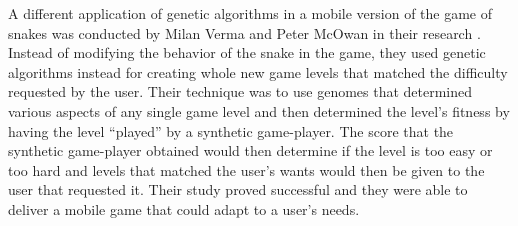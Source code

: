 A different application of genetic algorithms in a mobile version of the game of snakes was conducted by Milan Verma and Peter McOwan in their research \cite{Verma05}. Instead of modifying the behavior of the 
snake in the game, they used genetic algorithms instead for creating whole new game levels that matched the difficulty requested by the user. Their technique was to use genomes that determined various 
aspects of any single game level and then determined the level's fitness by having the level “played” by a synthetic game-player. The score that the synthetic game-player obtained would then determine 
if the level is too easy or too hard and levels that matched the user's wants would then be given to the user that requested it. Their study proved successful and they were able to deliver a 
mobile game that could adapt to a user's needs.